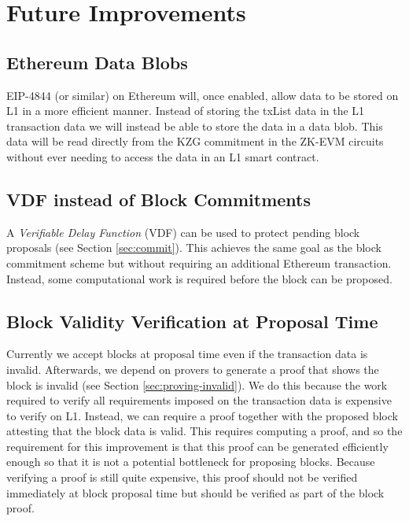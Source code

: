\documentclass[9pt,oneside]{amsart}
\begin{document}
\begin{multicols}{2}
\label{sec:priceStateUpdate}

\section{Future Improvements}\label{sec:improvements}

\subsection{Ethereum Data Blobs}\label{sec:datablobs}
EIP-4844 \cite{eip4844} (or similar) on Ethereum will, once enabled, allow data to be stored on L1 in a more efficient manner. Instead of storing the txList data in the L1 transaction data we will instead be able to store the data in a data blob. This data will be read directly from the KZG commitment in the ZK-EVM circuits without ever needing to access the data in an L1 smart contract.

\subsection{VDF instead of Block Commitments}\label{sec:vdf}
A \emph{Verifiable Delay Function} (VDF) can be used to protect pending block proposals (see Section \ref{sec:commit}). This achieves the same goal as the block commitment scheme but without requiring an additional Ethereum transaction. Instead, some computational work is required before the block can be proposed.

\subsection{Block Validity Verification at Proposal Time}\label{sec:propose-proof}
Currently we accept blocks at proposal time even if the transaction data is invalid. Afterwards, we depend on provers to generate a proof that shows the block is invalid (see Section \ref{sec:proving-invalid}). We do this because the work required to verify all requirements imposed on the transaction data is expensive to verify on L1. Instead, we can require a proof together with the proposed block attesting that the block data is valid. This requires computing a proof, and so the requirement for this improvement is that this proof can be generated efficiently enough so that it is not a potential bottleneck for proposing blocks. Because verifying a proof is still quite expensive, this proof should not be verified immediately at block proposal time but should be verified as part of the block proof.


\end{multicols}
\end{document}
